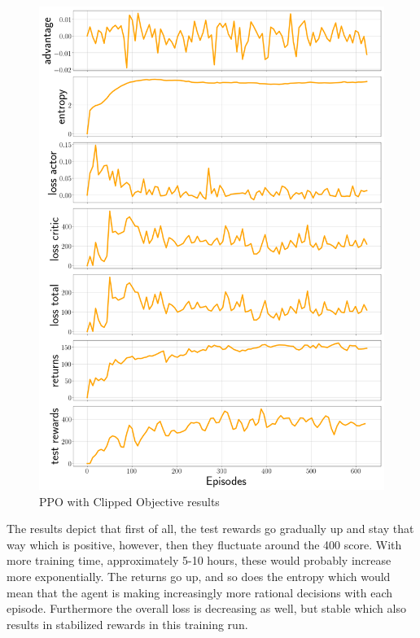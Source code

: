 \documentclass[12pt,a4paper]{article}
\begin{document}
\begin{figure}[H]
\begin{center}
\includegraphics[width=\columnwidth, angle = 0]{img/results.png}
\end{center}
\caption{PPO with Clipped Objective  results \cite{berkley} }
\label{img:ppo_clipped}
\end{figure}



The results depict that first of all, the test rewards go gradually up and stay that way which is positive, however, then they fluctuate around the 400 score. With more training time, approximately 5-10 hours, these would probably increase more exponentially. The returns go up, and so does the entropy which would mean that the agent is making increasingly more rational decisions with each episode.  Furthermore the overall loss is decreasing as well, but stable which also results in stabilized rewards in this training run.
\end{document}
